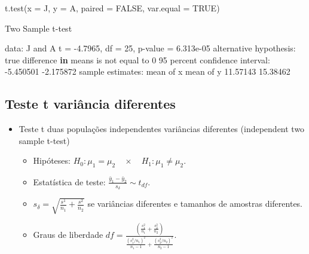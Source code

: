 \documentclass[
  10pt,
  a4paper]{book}
\newenvironment{Shaded}{\begin{snugshade}}{\end{snugshade}}
\newcommand{\AttributeTok}[1]{\textcolor[rgb]{0.77,0.63,0.00}{#1}}
\newcommand{\ConstantTok}[1]{\textcolor[rgb]{0.00,0.00,0.00}{#1}}
\newcommand{\ControlFlowTok}[1]{\textcolor[rgb]{0.13,0.29,0.53}{\textbf{#1}}}
\newcommand{\DecValTok}[1]{\textcolor[rgb]{0.00,0.00,0.81}{#1}}
\newcommand{\FloatTok}[1]{\textcolor[rgb]{0.00,0.00,0.81}{#1}}
\newcommand{\FunctionTok}[1]{\textcolor[rgb]{0.00,0.00,0.00}{#1}}
\newcommand{\NormalTok}[1]{#1}
\newcommand{\OtherTok}[1]{\textcolor[rgb]{0.56,0.35,0.01}{#1}}
\newcommand{\SpecialCharTok}[1]{\textcolor[rgb]{0.00,0.00,0.00}{#1}}
\providecommand{\tightlist}{%
  \setlength{\itemsep}{0pt}\setlength{\parskip}{0pt}}
\begin{document}
\begin{Shaded}
\begin{Highlighting}[]
\FunctionTok{t.test}\NormalTok{(}\AttributeTok{x =}\NormalTok{ J, }\AttributeTok{y =}\NormalTok{ A, }\AttributeTok{paired =} \ConstantTok{FALSE}\NormalTok{, }\AttributeTok{var.equal =} \ConstantTok{TRUE}\NormalTok{)}

\NormalTok{    Two Sample t}\SpecialCharTok{{-}}\NormalTok{test}

\NormalTok{data}\SpecialCharTok{:}\NormalTok{  J and A}
\NormalTok{t }\OtherTok{=} \SpecialCharTok{{-}}\FloatTok{4.7965}\NormalTok{, df }\OtherTok{=} \DecValTok{25}\NormalTok{, p}\SpecialCharTok{{-}}\NormalTok{value }\OtherTok{=} \FloatTok{6.313e{-}05}
\NormalTok{alternative hypothesis}\SpecialCharTok{:}\NormalTok{ true difference }\ControlFlowTok{in}\NormalTok{ means is not equal to }\DecValTok{0}
\DecValTok{95}\NormalTok{ percent confidence interval}\SpecialCharTok{:}
 \SpecialCharTok{{-}}\FloatTok{5.450501} \SpecialCharTok{{-}}\FloatTok{2.175872}
\NormalTok{sample estimates}\SpecialCharTok{:}
\NormalTok{mean of x mean of y }
 \FloatTok{11.57143}  \FloatTok{15.38462} 
\end{Highlighting}
\end{Shaded}

\hypertarget{teste-t-variuxe2ncia-diferentes}{%
\subsection{Teste t variância diferentes}\label{teste-t-variuxe2ncia-diferentes}}

\begin{itemize}
\tightlist
\item
  Teste t duas populações independentes variâncias diferentes (independent two sample t-test)

  \begin{itemize}
  \tightlist
  \item
    Hipóteses: \(H_0: \mu_1 = \mu_2 \quad \times \quad H_1: \mu_1 \neq \mu_2.\)
  \item
    Estatística de teste: \(\frac{\bar{y}_1 - \bar{y}_2}{s_{\delta}} \sim t_{df}.\)
  \item
    \(s_{\delta} = \sqrt{\frac{s^1}{n_1} + \frac{s^2}{n_2}}\) se variâncias diferentes e tamanhos de amostras diferentes.
  \item
    Graus de liberdade \(df = \frac{\left ( \frac{s^2_1}{n_1} + \frac{s^2_2}{n_2} \right )}{\frac{(s^2_1/n_1)^2}{n_1 - 1} + \frac{(s^2_2/n_2)^2}{n_2 - 1}}.\)
  \end{itemize}
\end{itemize}
\end{document}
